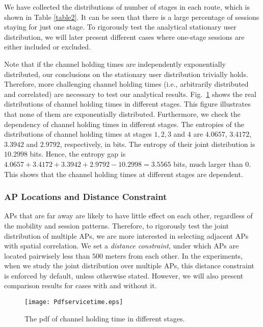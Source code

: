 We have collected the distributions of number of stages in each route, which is shown in Table \ref{table2}.  It can be seen that there is a large percentage of sessions staying for just one stage.  To rigorously test the analytical stationary user distribution, we will later present different cases where one-stage sessions are either included or excluded.

Note that if the channel holding times are independently exponentially distributed, our conclusions on the stationary user distribution trivially holds. Therefore, more challenging channel holding times (i.e., arbitrarily distributed and correlated) are necessary to test our analytical results. Fig.~\ref{servicetime} shows the real distributions of channel holding times in different stages. This figure illustrates that none of them are exponentially distributed.  Furthermore, we check the dependency of channel holding times in different stages. The entropies of the distributions of channel holding times at stages $1, 2, 3$ and $4$ are $4.0657$, $3.4172$, $3.3942$ and $2.9792$, respectively, in bits. The entropy of their joint distribution is $10.2998$ bits. Hence, the entropy gap is $4.0657+3.4172+3.3942+2.9792-10.2998=3.5565$ bits, much larger than $0$.  This shows that the channel holding times at different stages are dependent.


\subsubsection{AP Locations and Distance Constraint}
APs that are far away are likely to have little effect on each other, regardless of the mobility and session patterns.  Therefore, to rigorously test the joint distribution of multiple APs, we are more interested in selecting adjacent APs with spatial correlation.  We set a \emph{distance constraint}, under which APs are located pairwisely less than $500$ meters from each other. In the experiments, when we study the joint distribution over multiple APs, this distance constraint is enforced by default, unless otherwise stated. However, we will also present comparison results for
cases with and without it.


\begin{figure}[tbp]
\centering  \hspace{0pt}
\texttt{[image: Pdfservicetime.eps]}
\caption{The pdf of channel holding time in different stages.}
\label{servicetime}
\end{figure}





